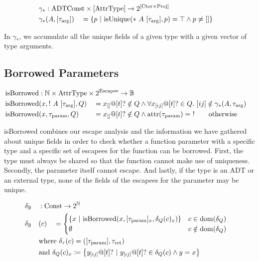 \begin{alignat*}{3}
	\gamma_* &: \mathrlap{\ADTConst \times [\AttrType] \to 2^{[\Ctor \times \Proj]}} \\
	\gamma_*&(A, [\tau_\arrg]) &&= \left\{ p \ |\ \isUnique(*\ A\ [\tau_\arrg], p) = \top \land p \neq [] \right\}
\end{alignat*}

In $\gamma_*$, we accumulate all the unique fields of a given type with a given vector of type arguments.

\subsection{Borrowed Parameters}

\newcommand{\isBorrowed}{\mathrm{isBorrowed}}

\begin{alignat*}{3}
	\isBorrowed &: \mathrlap{\mathbb{N} \times \AttrType \times 2^{\Escapee} \to \mathbb{B}} \\
	\isBorrowed&(x, !\ A\ [\tau_\arrg], Q) &&= x_{[]}@[t]? \notin Q \land \forall x_{[ij]}@[t]? \in Q.\ [ij] \notin \gamma_*(A, \tau_\arrg) \\
	\isBorrowed&(x, \tau_\param, Q) &&= x_{[]}@[t]? \notin Q \land \attr(\tau_\param) =\ ! \qquad\text{otherwise}
\end{alignat*}

isBorrowed combines our escape analysis and the information we have gathered about unique fields in order to check whether a function parameter with a specific type and a specific set of escapees for the function can be borrowed. First, the type must always be shared so that the function cannot make use of uniqueness. Secondly, the parameter itself cannot escape. And lastly, if the type is an ADT or an external type, none of the fields of the escapees for the parameter may be unique.

\begin{alignat*}{3}
	&\delta_\mathbb{B} &&: \mathrlap{\Const \to 2^\mathbb{N}} \\
	&\delta_\mathbb{B}&&(c) &&= \begin{cases}
		\left\{x \ |\ \isBorrowed(x, [\tau_\param]_x, \delta_Q(c)_x) \right\} & c \in \dom(\delta_Q) \\
		\emptyset & c \notin \dom(\delta_Q)
	\end{cases}\\
	&\rebreak{\text{where}\ \delta_\tau(c) = ([\tau_\param], \tau_\ret)} \\
	&\rebreak{\text{and}\ \delta_Q(c)_x \coloneqq \left\{y_{[ij]}@[t]? \ |\ y_{[ij]}@[t]? \in \delta_Q(c) \land y = x \right\}}
\end{alignat*}


